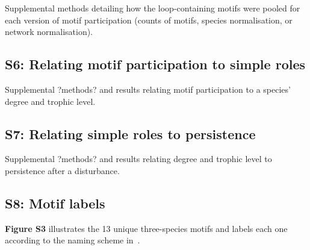 \documentclass[12pt]{article}
\begin{document}
    	Supplemental methods detailing how the loop-containing motifs were pooled for each version of motif participation (counts of motifs, species normalisation, or network normalisation).


    \subsection*{S6: Relating motif participation to simple roles}

    	Supplemental ?methods? and results relating motif participation to a species' degree and trophic level.


    \subsection*{S7: Relating simple roles to persistence}

        Supplemental ?methods? and results relating degree and trophic level to persistence after a disturbance.


    \subsection*{S8: Motif labels}
        
        \textbf{Figure S3} illustrates the 13 unique three-species motifs and labels each one according to the naming scheme in~\citet{Stouffer2007}.
\end{document}
